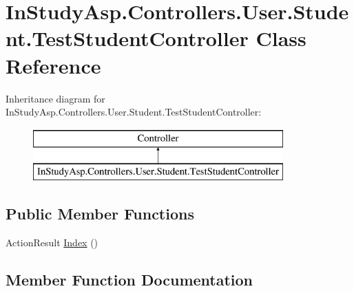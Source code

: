 \hypertarget{class_in_study_asp_1_1_controllers_1_1_user_1_1_student_1_1_test_student_controller}{}\section{In\+Study\+Asp.\+Controllers.\+User.\+Student.\+Test\+Student\+Controller Class Reference}
\label{class_in_study_asp_1_1_controllers_1_1_user_1_1_student_1_1_test_student_controller}
Inheritance diagram for In\+Study\+Asp.\+Controllers.\+User.\+Student.\+Test\+Student\+Controller\+:\begin{figure}[H]
\begin{center}
\leavevmode
\includegraphics[height=2.000000cm]{class_in_study_asp_1_1_controllers_1_1_user_1_1_student_1_1_test_student_controller}
\end{center}
\end{figure}
\subsection*{Public Member Functions}
\begin{DoxyCompactItemize}
\item 
Action\+Result \hyperlink{class_in_study_asp_1_1_controllers_1_1_user_1_1_student_1_1_test_student_controller_a9bee94150395832ec87d244051a20130}{Index} ()
\end{DoxyCompactItemize}


\subsection{Member Function Documentation}
\mbox{\label{class_in_study_asp_1_1_controllers_1_1_user_1_1_student_1_1_test_student_controller_a9bee94150395832ec87d244051a20130}} 
